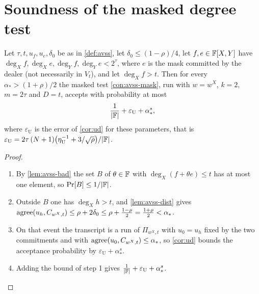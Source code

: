 \section{Soundness of the masked degree test}

{\renewcommand{\theproposition}{P2}
\begin{proposition}[Soundness]\label{prop:avss-sound}
Let $\tau,t,u_f,u_e,\delta_0$ be as in \cref{def:avss}, let $\delta_0\le(1-\rho)/4$, let
$f,e\in\mathbb{F}[X,Y]$ have $\deg_Xf,\deg_Xe,\deg_Yf,\deg_Ye<2^\tau$, where $e$ is the mask committed by the
dealer (not necessarily in $V_t$), and let $\deg_Xf>t$. Then for every $\alpha_*>(1+\rho)/2$ the masked test
\cref{con:avss-mask}, run with $w=w^X$, $k=2$, $m=2\tau$ and $D=t$, accepts with probability at
most
\[
\frac1{|\mathbb{F}|}+\varepsilon_{\mathrm U}+\alpha_*^s,
\]
where $\varepsilon_{\mathrm U}$ is the error of \cref{cor:ud} for these parameters, that is
$\varepsilon_{\mathrm U}=2\tau\,(N+1)\big(\eta_{\mathrm U}^{-1}+3/\sqrt\rho\big)/|\mathbb{F}|$.
\end{proposition}}

\begin{proof}\begin{enumerate}
\item By \cref{lem:avss-bad} the set $B$ of $\theta\in\mathbb{F}$ with $\deg_X(f+\theta e)\le t$ has at
most one element, so $\Pr[B]\le1/|\mathbb{F}|$.
\item Outside $B$ one has $\deg_Xh>t$, and \cref{lem:avss-dist} gives
$\mathrm{agree}(u_h,C_{w^X,t})\le\rho+2\delta_0\le\rho+\frac{1-\rho}2=\frac{1+\rho}2<\alpha_*$.
\item On that event the transcript is a run of $\Pi_{w^X,t}$ with $u_0=u_h$ fixed by the two
commitments and with $\mathrm{agree}(u_0,C_{w^X,t})\le\alpha_*$, so \cref{cor:ud} bounds the acceptance
probability by $\varepsilon_{\mathrm U}+\alpha_*^s$.
\item Adding the bound of step 1 gives $\frac1{|\mathbb{F}|}+\varepsilon_{\mathrm U}+\alpha_*^s$.
\end{enumerate}\end{proof}

